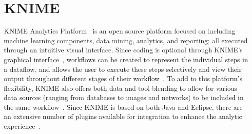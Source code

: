 \section{KNIME}

KNIME Analytics Platform~\cite{hid-sp18-504-pred-knime} is an open source 
platform focused on including machine learning components, data mining, 
analytics, and reporting; all executed through an intuitive visual interface. 
Since coding is optional through KNIME's graphical 
interface~\cite{hid-sp18-504-knime}, workflows can be created to represent the 
individual steps in a dataflow, and allows the user to execute these steps 
selectively and view their output throughout different stages of their 
workflow~\cite{hid-sp18-504-pred-knime}. To add to this platform's flexibility,
KNIME also offers both data and tool blending to allow for various data sources
(ranging from databases to images and networks) to be included in the same
workflow~\cite{hid-sp18-504-knime}. Since KNIME is based on both Java 
and Eclipse, there are an extensive number of plugins available for 
integration to enhance the analytic experience~\cite{hid-sp18-504-pred-knime}.

